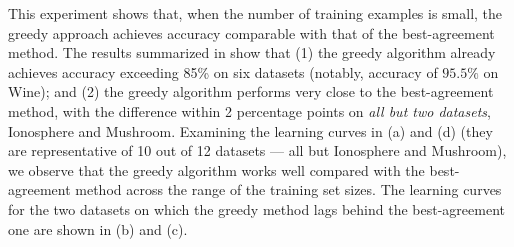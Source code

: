 This experiment shows that, when the number of training examples 
is small, the greedy approach achieves accuracy comparable with that of
the best-agreement method. The results summarized in  show 
that (1) the greedy algorithm already achieves accuracy exceeding 85\%
on six datasets (notably, accuracy of $95.5\%$ on Wine); and (2) the 
greedy algorithm performs very close to the best-agreement method, with the
difference within 2 percentage points on \emph{all but two datasets}, Ionosphere and 
Mushroom. Examining the learning curves in (a) and (d) (they are 
representative of 10 out of 12 datasets --- all but Ionosphere and Mushroom), we observe 
that the greedy algorithm works well compared with the best-agreement method
across the range of the training set sizes. The learning curves for the two 
datasets on which the greedy method lags behind the best-agreement one are 
shown in (b) and (c).


